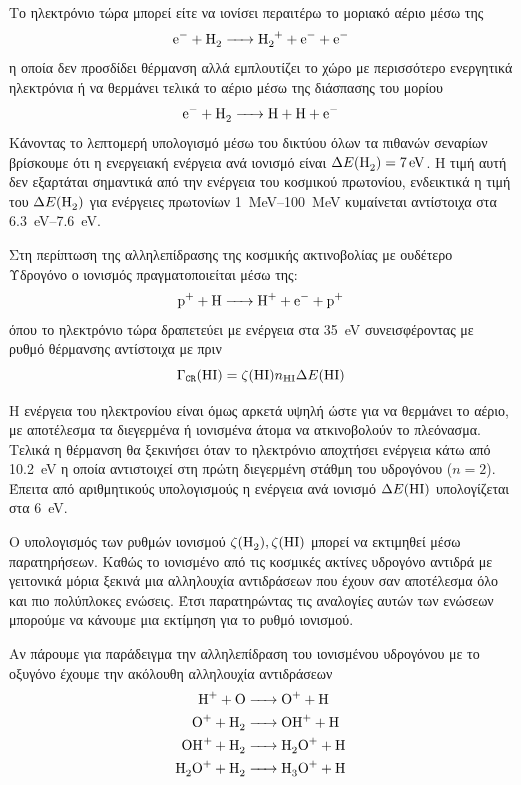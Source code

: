 Το ηλεκτρόνιο τώρα μπορεί είτε να ιονίσει περαιτέρω το μοριακό αέριο μέσω της
\begin{equation}
\ce{e^- + H2 -> H2^+ + e^- + e^-}
\end{equation}
η οποία δεν προσδίδει θέρμανση αλλά εμπλουτίζει το χώρο με περισσότερο ενεργητικά ηλεκτρόνια ή να θερμάνει τελικά το αέριο μέσω της διάσπασης του μορίου
\begin{equation}
\ce{e^- + H2 -> H + H + e^-}
\end{equation} 
Κάνοντας το λεπτομερή υπολογισμό μέσω του δικτύου όλων τα πιθανών σεναρίων βρίσκουμε ότι η ενεργειακή ενέργεια ανά ιονισμό είναι $\Delta E (\ce{H2}) = \SI{7}{eV}$. Η τιμή αυτή δεν εξαρτάται σημαντικά από την ενέργεια του κοσμικού πρωτονίου, ενδεικτικά η τιμή του $\Delta E (\ce{H2})$ για ενέργειες πρωτονίων \SIrange{1}{100}{MeV} κυμαίνεται αντίστοιχα στα \SIrange{6.3}{7.6}{eV}.

Στη περίπτωση της αλληλεπίδρασης της κοσμικής ακτινοβολίας με ουδέτερο Υδρογόνο ο ιονισμός πραγματοποιείται μέσω της:
\begin{equation}
\ce{p^+ + H -> H^+ + e^- + p^+}
\end{equation}
όπου το ηλεκτρόνιο τώρα δραπετεύει με ενέργεια στα \SI{35}{eV} συνεισφέροντας με ρυθμό θέρμανσης αντίστοιχα με πριν
\begin{equation}
\Gamma _\mathtt{CR} (\ce{HI}) =\zeta (\ce{HI})n_{\ce{HI}} \Delta E (\ce{HI})
\end{equation}

Η ενέργεια του ηλεκτρονίου είναι όμως αρκετά υψηλή ώστε για να θερμάνει το αέριο, με αποτέλεσμα τα διεγερμένα ή ιονισμένα άτομα να ατκινοβολούν το πλεόνασμα. Τελικά η θέρμανση θα ξεκινήσει όταν το ηλεκτρόνιο αποχτήσει ενέργεια κάτω από \SI{10.2}{eV} η οποία αντιστοιχεί στη πρώτη διεγερμένη στάθμη του υδρογόνου ($n=2$). Έπειτα από αριθμητικούς υπολογισμούς η ενέργεια ανά ιονισμό $\Delta E (\ce{HI})$ υπολογίζεται στα \SI{6}{eV}.

Ο υπολογισμός των ρυθμών ιονισμού $\zeta (\ce{H2}),\zeta (\ce{HI})$ μπορεί να εκτιμηθεί μέσω παρατηρήσεων. Καθώς το ιονισμένο από τις κοσμικές ακτίνες υδρογόνο αντιδρά με γειτονικά μόρια ξεκινά μια αλληλουχία αντιδράσεων που έχουν σαν αποτέλεσμα όλο και πιο πολύπλοκες ενώσεις. Έτσι παρατηρώντας τις αναλογίες αυτών των ενώσεων μπορούμε να κάνουμε μια εκτίμηση για το ρυθμό ιονισμού.

Αν πάρουμε για παράδειγμα την αλληλεπίδραση του ιονισμένου υδρογόνου με το οξυγόνο έχουμε την ακόλουθη αλληλουχία αντιδράσεων
\begin{align}
\ce{H^+ + O &-> O^+ + H} \\
\ce{O^+ + H2 &-> OH^+ + H}\\
\ce{OH ^+ + H2 &-> H2O^+ + H}\\
\ce{H2O^+ + H2 &-> H3O^+ + H}
\end{align}

